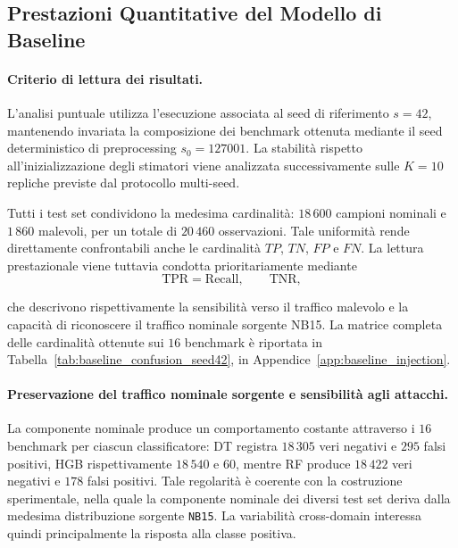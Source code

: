 
\subsection{Prestazioni Quantitative del Modello di Baseline}
\label{subsec:baseline_prestazioni_comparative}

\paragraph{Criterio di lettura dei risultati.}
L'analisi puntuale utilizza l'esecuzione associata al seed di riferimento $s=42$, mantenendo invariata la composizione dei benchmark ottenuta mediante il seed deterministico di preprocessing $s_{0}=127001$. 
La stabilità rispetto all'inizializzazione degli stimatori viene analizzata successivamente sulle $K=10$ repliche previste dal protocollo multi-seed.

Tutti i test set condividono la medesima cardinalità:
$18\,600$ campioni nominali e $1\,860$ malevoli, per un totale di $20\,460$ osservazioni. 
Tale uniformità rende direttamente confrontabili anche le cardinalità $TP$, $TN$, $FP$ e $FN$. 
La lettura prestazionale viene tuttavia condotta prioritariamente mediante
\[
    \mathrm{TPR}=\mathrm{Recall},
    \qquad
    \mathrm{TNR},
\]

che descrivono rispettivamente la sensibilità verso il traffico malevolo e la capacità di riconoscere il traffico nominale sorgente NB15. 
La matrice completa delle cardinalità ottenute sui $16$ benchmark è riportata in Tabella~\ref{tab:baseline_confusion_seed42}, in Appendice~\ref{app:baseline_injection}.

\paragraph{Preservazione del traffico nominale sorgente e sensibilità agli attacchi.}
La componente nominale produce un comportamento costante attraverso i $16$ benchmark per ciascun classificatore: DT registra $18\,305$ veri negativi e $295$ falsi positivi, HGB rispettivamente $18\,540$ e $60$, mentre RF produce $18\,422$ veri negativi e $178$ falsi positivi. 
Tale regolarità è coerente con la costruzione sperimentale, nella quale la componente nominale dei diversi test set deriva dalla medesima distribuzione sorgente \texttt{NB15}. 
La variabilità cross-domain interessa quindi principalmente la risposta alla classe positiva.


